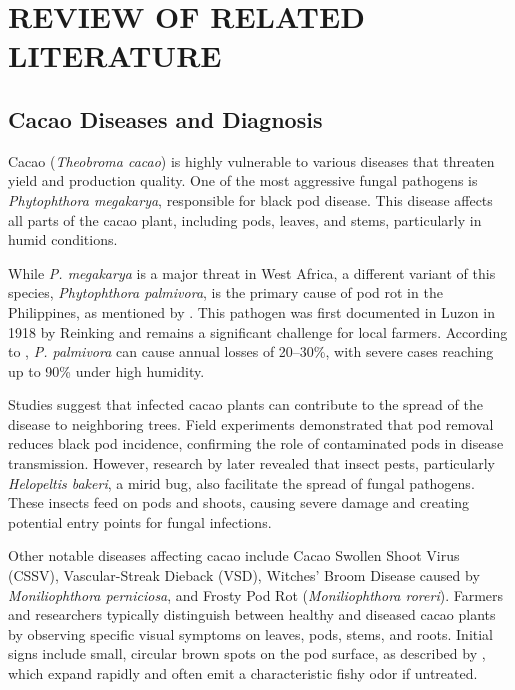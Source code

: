 \chapter{REVIEW OF RELATED LITERATURE}
\section{Cacao Diseases and Diagnosis}
Cacao (\textit{Theobroma cacao}) is highly vulnerable to various diseases that threaten yield and production quality. One of the most aggressive fungal pathogens is \textit{Phytophthora megakarya}, responsible for black pod disease. This disease affects all parts of the cacao plant, including pods, leaves, and stems, particularly in humid conditions. 

While \textit{P. megakarya} is a major threat in West Africa, a different variant of this species, \textit{Phytophthora palmivora}, is the primary cause of pod rot in the Philippines, as mentioned by \cite{Solpot2020}. This pathogen was first documented in Luzon in 1918 by Reinking and remains a significant challenge for local farmers. According to \cite{MinistryAgri}, \textit{P. palmivora} can cause annual losses of 20--30\%, with severe cases reaching up to 90\% under high humidity.

Studies suggest that infected cacao plants can contribute to the spread of the disease to neighboring trees. Field experiments demonstrated that pod removal reduces black pod incidence, confirming the role of contaminated pods in disease transmission. However, research by \cite{Babin2018} later revealed that insect pests, particularly \textit{Helopeltis bakeri}, a mirid bug, also facilitate the spread of fungal pathogens. These insects feed on pods and shoots, causing severe damage and creating potential entry points for fungal infections.

Other notable diseases affecting cacao include Cacao Swollen Shoot Virus (CSSV), Vascular-Streak Dieback (VSD), Witches' Broom Disease caused by \textit{Moniliophthora perniciosa}, and Frosty Pod Rot (\textit{Moniliophthora roreri}). Farmers and researchers typically distinguish between healthy and diseased cacao plants by observing specific visual symptoms on leaves, pods, stems, and roots. Initial signs include small, circular brown spots on the pod surface, as described by \cite{MinistryAgri}, which expand rapidly and often emit a characteristic fishy odor if untreated.

